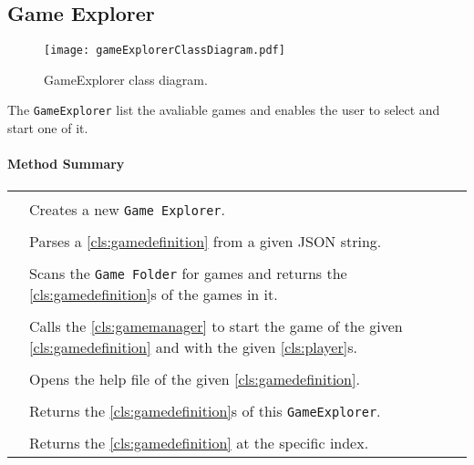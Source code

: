 \subsection{Game Explorer}

\begin{figure}[h]
	\centering
	\texttt{[image: gameExplorerClassDiagram.pdf]}
	\caption{GameExplorer class diagram.}
	\label{img:gameExplorerClassDiagram}
\end{figure}
\pagebreak

The \texttt{GameExplorer} list the avaliable games and enables the user to select and start one of it.

\centerdash

\paragraph*{Method Summary}
\paragraph*{}
\begin{longtable}{Lp{10cm}}
	\startmethodtable
	 \\
	& Creates a new \texttt{Game Explorer}. \\
	 \\
	& Parses a \ref{cls:gamedefinition} from a given JSON string. \\
	 \\
	& Scans the \texttt{Game Folder} for games and returns the \ref{cls:gamedefinition}s of the games in it. \\
	 \\
	& Calls the \ref{cls:gamemanager} to start the game of the given \ref{cls:gamedefinition} and with the given \ref{cls:player}s. \\
	 \\
	& Opens the help file of the given \ref{cls:gamedefinition}. \\
	 \\
	& Returns the \ref{cls:gamedefinition}s of this \texttt{GameExplorer}. \\
	 \\
	& Returns the \ref{cls:gamedefinition} at the specific index. \\
	\hline
\end{longtable}

